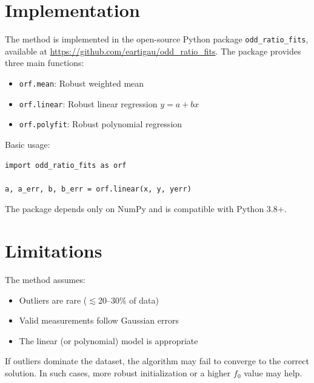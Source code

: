 \documentclass[twocolumn]{aastex631}
\begin{document}
\section{Implementation}
\label{sec:implementation}

The method is implemented in the open-source Python package \texttt{odd\_ratio\_fits},
available at \url{https://github.com/eartigau/odd_ratio_fits}. The package provides
three main functions:

\begin{itemize}
    \item \texttt{orf.mean}: Robust weighted mean
    \item \texttt{orf.linear}: Robust linear regression $y = a + bx$
    \item \texttt{orf.polyfit}: Robust polynomial regression
\end{itemize}

Basic usage:
\begin{verbatim}
import odd_ratio_fits as orf

a, a_err, b, b_err = orf.linear(x, y, yerr)
\end{verbatim}

The package depends only on NumPy and is compatible with Python 3.8+.


\section{Limitations}
\label{sec:limitations}

The method assumes:
\begin{itemize}
    \item Outliers are rare ($\lesssim 20$--30\% of data)
    \item Valid measurements follow Gaussian errors
    \item The linear (or polynomial) model is appropriate
\end{itemize}

If outliers dominate the dataset, the algorithm may fail to converge to the correct
solution. In such cases, more robust initialization or a higher $f_0$ value may help.


\end{document}
